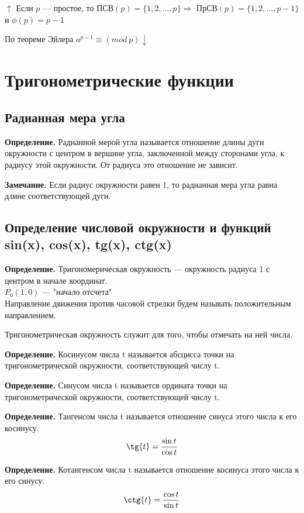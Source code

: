\documentclass{article}
\begin{document}
            $\uparrow$ Если $p$ --- простое, то ПСВ$(p) = \{1,2,...,p\} \Rightarrow$ ПрСВ$(p) = \{1,2,...,p-1\}$ и $\phi(p)=p - 1$
            
            По теореме Эйлера $a^{p-1} \equiv (mod\ p) \downarrow$
            
    \section{Тригонометрические функции}
     	\subsection{Радианная мера угла}
        
        \textbf{Определение.} Радианной мерой угла называется отношение длины дуги окружности с центром в вершине угла, заключенной между сторонами угла, к радиусу этой окружности. От радиуса это отношение не зависит.
    
    	\textbf{Замечание.} Если радиус окружности равен 1, то радианная мера угла равна длине соответствующей дуги.
        
        \subsection{Определение числовой окружности и функций sin(x), cos(x), tg(x), ctg(x)}
        
        \textbf{Определение.}  Тригономерическая окружность --- окружность радиуса 1 с центром в начале координат.
        \\ \(P_0(1, 0)\) --- "начало отсчета"
        \\Направление движения против часовой стрелки будем называть положительным направлением.
        
        Тригонометрическая окружность служит для того, чтобы отмечать на ней числа.
        
        \textbf{Определение.} Косинусом числа t называется абсцисса точки на тригонометрической окружности, соответствующей числу t.
        
        \textbf{Определение.} Синусом числа t называется ордината точки на тригонометрической окружности, соответствующей числу t.
        
        \textbf{Определение.} Тангенсом числа t называется отношение синуса этого числа к его косинусу.
        \[\tg{t} = \frac{\sin{t}}{\cos{t}}\]
      
        \textbf{Определение.} Котангенсом числа t называется отношение косинуса этого числа к его синусу.
        \[\ctg{t} = \frac{\cos{t}}{\sin{t}}\]
        
\end{document}

